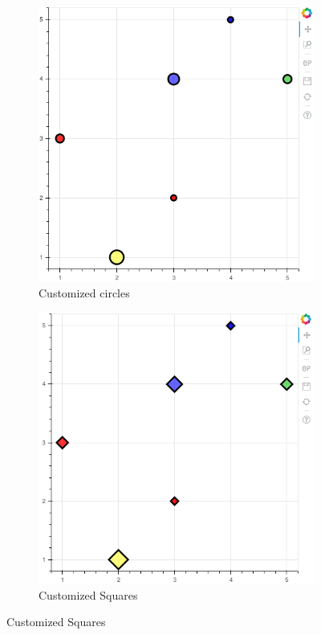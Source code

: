 \begin{figure}
\begin{subfigure}{.33\textwidth}
            \includegraphics[width=.9\linewidth]{BokehFigs/colored_circles.png}
            \caption{Customized circles}
            \label{fig:circles}
    \end{subfigure}%
    \begin{subfigure}{.33\textwidth}
        \centering
            \includegraphics[width=.9\linewidth]{BokehFigs/squares.png}
            \caption{Customized Squares}
            \label{fig:circles}
    \end{subfigure}

\end{figure}

